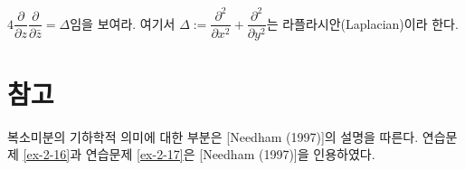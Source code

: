 \begin{salt_exercise} \label{ex-2-19}
$4\dfrac{\partial}{\partial z}\dfrac{\partial}{\partial \bar z} = \Delta$임을 보여라.
여기서 $\Delta := \dfrac{\partial^2}{\partial x^2} + \dfrac{\partial^2}{\partial y^2}$는
라플라시안(Laplacian)이라 한다.
\end{salt_exercise}

\section{참고}

복소미분의 기하학적 의미에 대한 부분은  [Needham (1997)]의 설명을 따른다.
연습문제 \ref{ex-2-16}과  연습문제 \ref{ex-2-17}은 [Needham (1997)]을 인용하였다.




